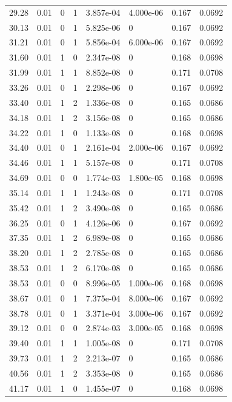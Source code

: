 \documentclass[preview]{standalone}
\begin{document}
{{{\begin{tabular}{L{1.2cm}C{1.2cm} C{0.3cm}C{0.5cm} C{1.4cm}C{1.4cm} C{1.4cm}C{1.4cm}}
  29.28  &  0.01  & 0     &  1 &  3.857e-04  & 4.000e-06  & 0.167 &  0.0692   \\ 
  30.13  &  0.01  & 0     &  1 &  5.825e-06  & 0  & 0.167 &  0.0692   \\ 
  31.21  &  0.01  & 0     &  1 &  5.856e-04  & 6.000e-06  & 0.167 &  0.0692   \\ 
  31.60  &  0.01  & 1     &  0 &  2.347e-08  & 0  & 0.168 &  0.0698   \\ 
  31.99  &  0.01  & 1     &  1 &  8.852e-08  & 0  & 0.171 &  0.0708   \\ 
  33.26  &  0.01  & 0     &  1 &  2.298e-06  & 0  & 0.167 &  0.0692   \\ 
  33.40  &  0.01  & 1     &  2 &  1.336e-08  & 0  & 0.165 &  0.0686   \\ 
  34.18  &  0.01  & 1     &  2 &  3.156e-08  & 0  & 0.165 &  0.0686   \\ 
  34.22  &  0.01  & 1     &  0 &  1.133e-08  & 0  & 0.168 &  0.0698   \\ 
  34.40  &  0.01  & 0     &  1 &  2.161e-04  & 2.000e-06  & 0.167 &  0.0692   \\ 
  34.46  &  0.01  & 1     &  1 &  5.157e-08  & 0  & 0.171 &  0.0708   \\ 
  34.69  &  0.01  & 0     &  0 &  1.774e-03  & 1.800e-05  & 0.168 &  0.0698   \\ 
  35.14  &  0.01  & 1     &  1 &  1.243e-08  & 0  & 0.171 &  0.0708   \\ 
  35.42  &  0.01  & 1     &  2 &  3.490e-08  & 0  & 0.165 &  0.0686   \\ 
  36.25  &  0.01  & 0     &  1 &  4.126e-06  & 0  & 0.167 &  0.0692   \\ 
  37.35  &  0.01  & 1     &  2 &  6.989e-08  & 0  & 0.165 &  0.0686   \\ 
  38.20  &  0.01  & 1     &  2 &  2.785e-08  & 0  & 0.165 &  0.0686   \\ 
  38.53  &  0.01  & 1     &  2 &  6.170e-08  & 0  & 0.165 &  0.0686   \\ 
  38.53  &  0.01  & 0     &  0 &  8.996e-05  & 1.000e-06  & 0.168 &  0.0698   \\ 
  38.67  &  0.01  & 0     &  1 &  7.375e-04  & 8.000e-06  & 0.167 &  0.0692   \\ 
  38.78  &  0.01  & 0     &  1 &  3.371e-04  & 3.000e-06  & 0.167 &  0.0692   \\ 
  39.12  &  0.01  & 0     &  0 &  2.874e-03  & 3.000e-05  & 0.168 &  0.0698   \\ 
  39.40  &  0.01  & 1     &  1 &  1.005e-08  & 0  & 0.171 &  0.0708   \\ 
  39.73  &  0.01  & 1     &  2 &  2.213e-07  & 0  & 0.165 &  0.0686   \\ 
  40.56  &  0.01  & 1     &  2 &  3.353e-08  & 0  & 0.165 &  0.0686   \\ 
  41.17  &  0.01  & 1     &  0 &  1.455e-07  & 0  & 0.168 &  0.0698   \\ 
\hline 
\end{tabular} 

}}}
\end{document}
